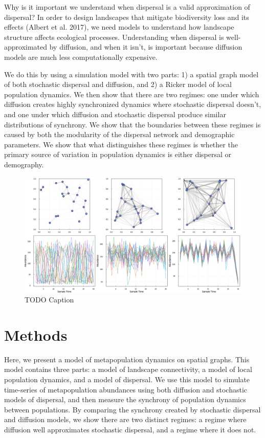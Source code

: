 \documentclass[11pt]{article}
\makeatletter
\def\maxwidth{\ifdim\Gin@nat@width>\linewidth\linewidth
\else\Gin@nat@width\fi}
\let\Oldincludegraphics\includegraphics
\renewcommand{\includegraphics}[1]{\Oldincludegraphics[width=\maxwidth]{#1}}
\makeatother
\begin{document}
Why is it important we understand when dispersal is a valid
approximation of dispersal? In order to design landscapes that mitigate
biodiversity loss and its effects (Albert et al. 2017), we need models
to understand how landscape structure affects ecological processes.
Understanding when dispersal is well-approximated by diffusion, and when
it isn't, is important because diffusion models are much less
computationally expensive.

We do this by using a simulation model with two parts: 1) a spatial
graph model of both stochastic dispersal and diffusion, and 2) a Ricker
model of local population dynamics. We then show that there are two
regimes: one under which diffusion creates highly synchronized dynamics
where stochastic dispersal doesn't, and one under which diffusion and
stochastic dispersal produce similar distributions of synchrony. We show
that the boundaries between these regimes is caused by both the
modularity of the dispersal network and demographic parameters. We show
that what distinguishes these regimes is whether the primary source of
variation in population dynamics is either dispersal or demography.

\begin{figure}
\hypertarget{fig:example}{%
\centering
\includegraphics{./figures/synchrony_example.png}
\caption{TODO Caption}\label{fig:example}
}
\end{figure}

\hypertarget{methods}{%
\section{Methods}\label{methods}}

Here, we present a model of metapopulation dynamics on spatial graphs.
This model contains three parts: a model of landscape connectivity, a
model of local population dynamics, and a model of dispersal. We use
this model to simulate time-series of metapopulation abundances using
both diffusion and stochastic models of dispersal, and then measure the
synchrony of population dynamics between populations. By comparing the
synchrony created by stochastic dispersal and diffusion models, we show
there are two distinct regimes: a regime where diffusion well
approximates stochastic dispersal, and a regime where it does not.
\end{document}
